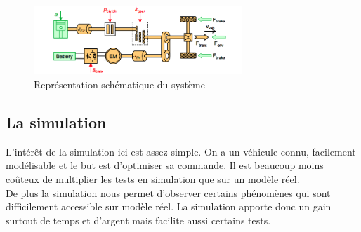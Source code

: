 \begin{figure}[ht]
	\begin{center}
	\includegraphics[width=0.7\textwidth]{images/Systeme_VEH.png}
	\caption{Représentation schématique du système}\label{img:Schéma système VEH}
	\end{center}
\end{figure}
\FloatBarrier 

\subsection{La simulation}		
L'intérêt de la simulation ici est assez simple. On a un véhicule connu, facilement modélisable et le but est d'optimiser sa commande. Il est beaucoup moins coûteux de multiplier les tests en simulation que sur un modèle réel.\\
De plus la simulation nous permet d'observer certains phénomènes qui sont difficilement accessible sur modèle réel. La simulation apporte donc un gain surtout de temps et d'argent mais facilite aussi certains tests.
